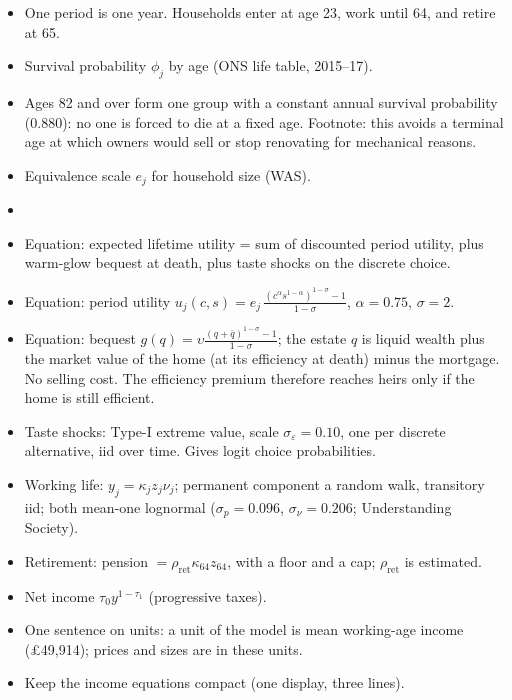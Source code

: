 \begin{itemize}
  \item One period is one year. Households enter at age 23, work until 64,
    and retire at 65.
  \item Survival probability $\phi_j$ by age (ONS life table, 2015--17).
  \item Ages 82 and over form one group with a constant annual survival
    probability (0.880): no one is forced to die at a fixed age. Footnote:
    this avoids a terminal age at which owners would sell or stop renovating
    for mechanical reasons.
  \item Equivalence scale $e_j$ for household size (WAS).
  \item {}
\end{itemize}

\begin{itemize}
  \item Equation: expected lifetime utility = sum of discounted period
    utility, plus warm-glow bequest at death, plus taste shocks on the
    discrete choice.
  \item Equation: period utility
    $u_j(c,s)=e_j\,\frac{(c^{\alpha}s^{1-\alpha})^{1-\sigma}-1}{1-\sigma}$,
    $\alpha=0.75$, $\sigma=2$.
  \item Equation: bequest
    $g(q)=\upsilon\frac{(q+\bar q)^{1-\sigma}-1}{1-\sigma}$;
    the estate $q$ is liquid wealth plus the market value of the home
    (at its efficiency at death) minus the mortgage. No selling cost.
    The efficiency premium therefore reaches heirs only if the home is
    still efficient.
  \item Taste shocks: Type-I extreme value, scale $\sigma_\varepsilon=0.10$,
    one per discrete alternative, iid over time. Gives logit choice
    probabilities.
\end{itemize}

\begin{itemize}
  \item Working life: $y_j=\kappa_j z_j \nu_j$; permanent component a
    random walk, transitory iid; both mean-one lognormal
    ($\sigma_p=0.096$, $\sigma_\nu=0.206$; Understanding Society).
  \item Retirement: pension $=\rho_{\mathrm{ret}}\kappa_{64}z_{64}$, with a
    floor and a cap; $\rho_{\mathrm{ret}}$ is estimated.
  \item Net income $\tau_0 y^{1-\tau_1}$ (progressive taxes).
  \item One sentence on units: a unit of the model is mean working-age
    income (\pounds49{,}914); prices and sizes are in these units.
  \item Keep the income equations compact (one display, three lines).
\end{itemize}

